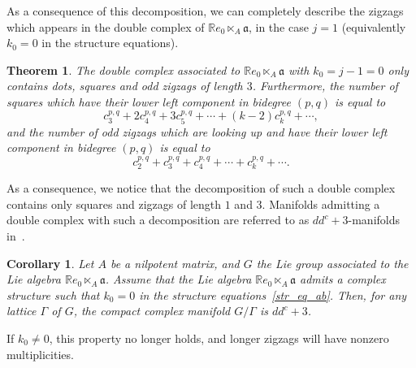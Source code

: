\documentclass[leqno]{article}
\newtheorem{Theorem}[equation]{Theorem}
\newtheorem{Corollary}[equation]{Corollary}
\theoremstyle{definition}
\numberwithin{equation}{section}
\begin{document}
As a consequence of this decomposition, we can completely describe the zigzags which appears in the double complex of $\mathbb{R}e_0 \ltimes_A \mathfrak{a}$, in the case $j=1$ (equivalently $k_0=0$ in the structure equations).
\begin{Theorem}
\label{dec_ab}
The double complex associated to $\mathbb{R}e_0 \ltimes_A \mathfrak{a}$ with $k_0=j-1=0$  only contains dots, squares and odd zigzags of length $3$. Furthermore, the number of squares which have their lower left component in bidegree $(p, q)$ is equal to
\[
c_3^{p, q} + 2c_4^{p,q} + 3c_5^{p, q} + \cdots + (k-2)c_k^{p, q} + \cdots,
\]
and the number of odd zigzags which are looking up and have their lower left component in bidegree $(p, q)$ is equal to
\[
c_2^{p, q} + c_3^{p, q} + c_4^{p, q} + \cdots + c_k^{p, q} + \cdots.
\]
\end{Theorem}
As a consequence, we notice that the decomposition of such a double complex contains only squares and zigzags of length $1$ and $3$. Manifolds admitting a double complex with such a decomposition are referred to as $dd^c+3$-manifolds in~\cite{SW}.
\begin{Corollary}
Let $A$ be a nilpotent matrix, and $G$ the Lie group associated to the Lie algebra $\mathbb{R}e_0 \ltimes_A \mathfrak{a}$.
Assume that the Lie algebra $\mathbb{R}e_0 \ltimes_A \mathfrak{a}$ admits a complex structure such that $k_0=0$ in the structure equations~\ref{str_eq_ab}. 
Then, for any lattice $\Gamma$ of $G$, the compact complex manifold $G / \Gamma$ is $dd^c+3$.
\end{Corollary}
If $k_0 \neq 0$, this property no longer holds, and longer zigzags will have nonzero multiplicities.
\end{document}
